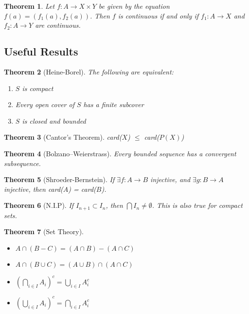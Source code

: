\documentclass[8pt,reqno,twocolumn]{amsart}
\newtheorem*{theorem*}{Theorem}
\theoremstyle{definition}
\begin{document}
\begin{theorem*}
    Let $f: A \to X \times Y$ be given by the equation $f(a) = (f_1(a),f_2(a))$. Then $f$ is continuous if and only if $f_1: A \to X$ and $f_2: A \to Y$ are continuous.
\end{theorem*}

\subsection*{Useful Results}
\begin{theorem*}[Heine-Borel]
    The following are equivalent:
    \begin{enumerate}
        \item[(1)] $S$ is compact
        \item[(2)] Every open cover of $S$ has a finite subcover
        \item[(3)] $S$ is closed and bounded
    \end{enumerate}
\end{theorem*}
\begin{theorem*}[Cantor's Theorem]
    card($X$) $\leq$ card($P(X)$)
\end{theorem*}
\begin{theorem*}[Bolzano–Weierstrass]
    Every bounded sequence has a convergent subsequence.
\end{theorem*}
\begin{theorem*}[Shroeder-Bernstein]
    If $\exists f: A \rightarrow B$ injective, and $\exists g: B \rightarrow A$ injective, then card($A$) = card($B$).
\end{theorem*}
\begin{theorem*}[N.I.P]
    If $I_{n+1} \subset I_n$, then $\bigcap I_n \neq \emptyset$. This is also true for compact sets.
    
\end{theorem*}
\begin{theorem*}[Set Theory]$ $
    \begin{itemize}
        \item $A \cap (B- C) = (A \cap B) - (A \cap C)$
        \item $A \cap (B \cup C) = (A \cup B) \cap (A \cap C)$
        \item $(\bigcap_{i\in I} A_i)^c = \bigcup_{i \in I} A_i^c$ 
        \item $(\bigcup_{i\in I} A_i)^c = \bigcap_{i \in I} A_i^c$
    \end{itemize}
\end{theorem*}
\end{document}
